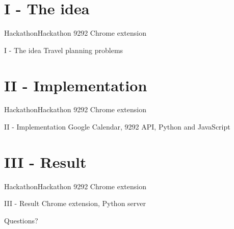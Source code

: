 \documentclass[14pt,aspectratio=169]{beamer}
\author{Nick van Bakel, Rick van der Heide \& Tim Vlaar}
\title{\TT}
\institute{Hogeschool van Amsterdam}
\date{20 september 2019}
\newcommand{\TT}{Hackathon 9292 Chrome extension}
\newcommand{\TB}{Hackathon}
\newcommand{\DT}{I - The idea}
\newcommand{\IN}{II - Implementation}
\newcommand{\PI}{III - Result}
\begin{document}
\begin{frame}
\titlepage
\end{frame}

\section{\DT}
\begin{frame}{\TB}{\TT}
 \begin{block}{\DT}
Travel planning problems
 \end{block}
\end{frame}

\section{\IN}
\begin{frame}{\TB}{\TT}
 \begin{block}{\IN}
Google Calendar, 9292 API, Python and JavaScript
 \end{block}
\end{frame}

\section{\PI}
\begin{frame}{\TB}{\TT}
 \begin{block}{\PI}
Chrome extension, Python server
 \end{block}
\end{frame}

\small
\begin{frame}
  \begin{center}
  Questions?
  \end{center}
\end{frame}
\end{document}
